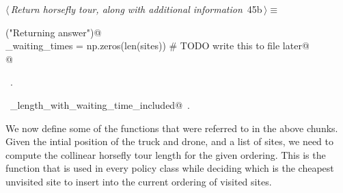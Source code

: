 \documentclass[11.5pt]{report}
\begin{document}
\begin{flushleft} \small\label{scrap63}\raggedright\small
{} $\langle\,${\itshape Return horsefly tour, along with additional information}\nobreak\ {\footnotesize {45b}}$\,\rangle\equiv$
\vspace{-1ex}
\begin{list}{}{} \item
\mbox{}\verb@debug("Returning answer")@\\
\mbox{}\verb@horse_waiting_times = np.zeros(len(sites)) # TODO write this to file later@\\
\mbox{}@\\
\mbox{}\verb@@{\NWsep}
\end{list}
\vspace{-1.5ex}
\footnotesize
\begin{list}{}{\setlength{\itemsep}{-\parsep}\setlength{\itemindent}{-\leftmargin}}
\item \NWtxtMacroRefIn\ .
\item \NWtxtIdentsUsed\nobreak\  \verb@tour_length_with_waiting_time_included@\nobreak\ .
\item{}
\end{list}
\vspace{4ex}
\end{flushleft}

\vspace{-0.8cm}\newchunk We now define some of the functions that were referred to in the above chunks. 
Given the intial position of the truck and drone, and a list of sites, we need to compute 
the collinear horsefly tour length for the given ordering. This is the function that is 
used in every policy class while deciding which is the cheapest unvisited site to insert 
into the current ordering of visited sites. 
\end{document}
